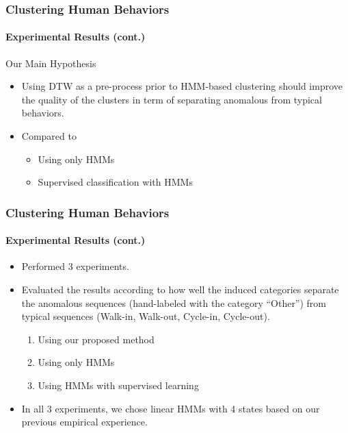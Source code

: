 \begin{frame}
    \frametitle{Clustering Human Behaviors}
    \framesubtitle{Experimental Results (cont.)}
    
    \begin{block}{Our Main Hypothesis}
        \begin{itemize}
            \item Using DTW as a pre-process prior to HMM-based 
                clustering should improve the quality of the clusters 
                in term of separating anomalous from typical behaviors.
            \item Compared to
                \begin{itemize}
                    \item Using only HMMs
                    \item Supervised classification with HMMs
                \end{itemize}
        \end{itemize}
    \end{block}

\end{frame}


\begin{frame}
    \frametitle{Clustering Human Behaviors}
    \framesubtitle{Experimental Results (cont.)}

    \begin{itemize}
        \item Performed 3 experiments.
        \item Evaluated the results according to how well 
            the induced categories separate the anomalous 
            sequences (hand-labeled with the category ``Other'') 
            from typical sequences (Walk-in, Walk-out, Cycle-in, 
            Cycle-out).
            \begin{enumerate}
                \item Using our proposed method
                \item Using only HMMs 
                \item Using HMMs with supervised learning
            \end{enumerate}
        \item In all 3 experiments, we chose linear HMMs with 4 
            states based on our previous empirical experience.
    \end{itemize}

\end{frame}

